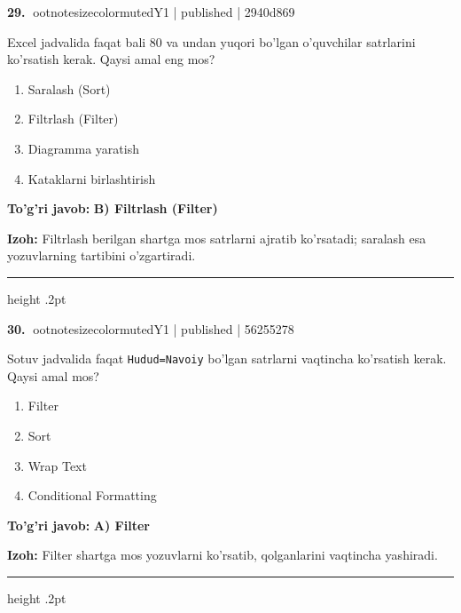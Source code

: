 \documentclass[10pt,a4paper]{article}
\begin{document}
\textbf{\color{ink}29.} {ootnotesizecolor{muted}Y1 | published | 2940d869}
\par
Excel jadvalida faqat bali 80 va undan yuqori bo'lgan o'quvchilar satrlarini ko'rsatish kerak. Qaysi amal eng mos?
\begin{enumerate}[label=\Alph*),leftmargin=9mm]
\item Saralash (Sort)
\item Filtrlash (Filter)
\item Diagramma yaratish
\item Kataklarni birlashtirish
\end{enumerate}
\begin{tcolorbox}[enhanced,breakable,colback=teal!4,colframe=teal!55!black,boxrule=0.45pt,arc=1.2mm,left=2.8mm,right=2.8mm,top=2mm,bottom=2mm]
\textbf{\color{teal}To'g'ri javob:} \textbf{B) Filtrlash (Filter)}
\par\smallskip
\textbf{Izoh:} Filtrlash berilgan shartga mos satrlarni ajratib ko'rsatadi; saralash esa yozuvlarning tartibini o'zgartiradi.
\end{tcolorbox}
\vspace{2mm}\hrule height .2pt\vspace{2mm}

\textbf{\color{ink}30.} {ootnotesizecolor{muted}Y1 | published | 56255278}
\par
Sotuv jadvalida faqat \texttt{Hudud=Navoiy} bo'lgan satrlarni vaqtincha ko'rsatish kerak. Qaysi amal mos?
\begin{enumerate}[label=\Alph*),leftmargin=9mm]
\item Filter
\item Sort
\item Wrap Text
\item Conditional Formatting
\end{enumerate}
\begin{tcolorbox}[enhanced,breakable,colback=teal!4,colframe=teal!55!black,boxrule=0.45pt,arc=1.2mm,left=2.8mm,right=2.8mm,top=2mm,bottom=2mm]
\textbf{\color{teal}To'g'ri javob:} \textbf{A) Filter}
\par\smallskip
\textbf{Izoh:} Filter shartga mos yozuvlarni ko'rsatib, qolganlarini vaqtincha yashiradi.
\end{tcolorbox}
\vspace{2mm}\hrule height .2pt\vspace{2mm}
\end{document}
